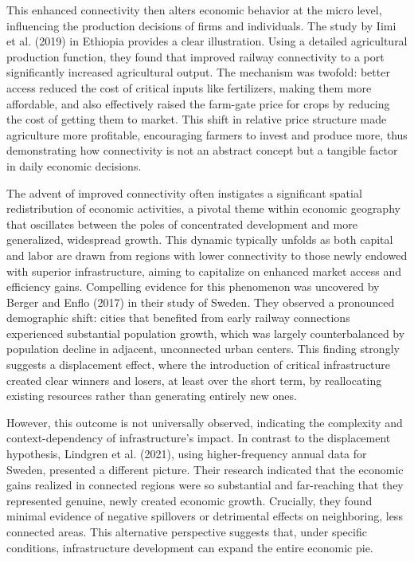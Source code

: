 \documentclass[12pt, a4paper]{article}
\begin{document}
This enhanced connectivity then alters economic behavior at the micro level, influencing the production decisions of firms and individuals. The study by Iimi et al. (2019) in Ethiopia provides a clear illustration. Using a detailed agricultural production function, they found that improved railway connectivity to a port significantly increased agricultural output. The mechanism was twofold: better access reduced the cost of critical inputs like fertilizers, making them more affordable, and also effectively raised the farm-gate price for crops by reducing the cost of getting them to market. This shift in relative price structure made agriculture more profitable, encouraging farmers to invest and produce more, thus demonstrating how connectivity is not an abstract concept but a tangible factor in daily economic decisions.

The advent of improved connectivity often instigates a significant spatial redistribution of economic activities, a pivotal theme within economic geography that oscillates between the poles of concentrated development and more generalized, widespread growth. This dynamic typically unfolds as both capital and labor are drawn from regions with lower connectivity to those newly endowed with superior infrastructure, aiming to capitalize on enhanced market access and efficiency gains. Compelling evidence for this phenomenon was uncovered by Berger and Enflo (2017) in their study of Sweden. They observed a pronounced demographic shift: cities that benefited from early railway connections experienced substantial population growth, which was largely counterbalanced by population decline in adjacent, unconnected urban centers. This finding strongly suggests a displacement effect, where the introduction of critical infrastructure created clear winners and losers, at least over the short term, by reallocating existing resources rather than generating entirely new ones.

However, this outcome is not universally observed, indicating the complexity and context-dependency of infrastructure's impact. In contrast to the displacement hypothesis, Lindgren et al. (2021), using higher-frequency annual data for Sweden, presented a different picture. Their research indicated that the economic gains realized in connected regions were so substantial and far-reaching that they represented genuine, newly created economic growth. Crucially, they found minimal evidence of negative spillovers or detrimental effects on neighboring, less connected areas. This alternative perspective suggests that, under specific conditions, infrastructure development can expand the entire economic pie.
\end{document}
